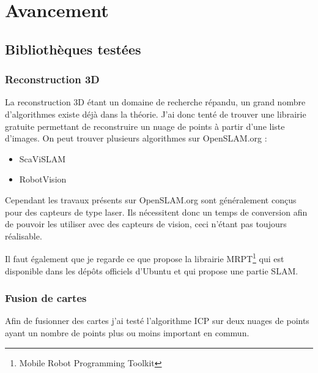 \section{Avancement}

\subsection{Bibliothèques testées}

\subsubsection{Reconstruction 3D}

La reconstruction 3D étant un domaine de recherche répandu, un grand nombre d'algorithmes existe déjà dans la théorie. J'ai donc tenté de trouver une librairie gratuite permettant de reconstruire un nuage de points à partir d'une liste d'images.
On peut trouver plusieurs algorithmes sur OpenSLAM.org :
\begin{itemize}
  \item ScaViSLAM
  \item RobotVision
\end{itemize}

Cependant les travaux présents sur OpenSLAM.org sont généralement conçus pour des capteurs de type laser. Ils nécessitent donc un temps de conversion afin de pouvoir les utiliser avec des capteurs de vision, ceci n'étant pas toujours réalisable.

Il faut également que je regarde ce que propose la librairie MRPT\footnote{Mobile Robot Programming Toolkit} qui est disponible dans les dépôts officiels d'Ubuntu et qui propose une partie SLAM.

\subsubsection{Fusion de cartes}

Afin de fusionner des cartes j'ai testé l'algorithme ICP sur deux nuages de points ayant un nombre de points plus ou moins important en commun.


